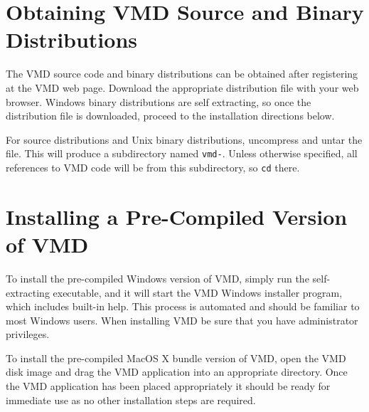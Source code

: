\documentclass[11pt]{article}
\begin{document}
\newpage


\newpage
\section{Obtaining VMD Source and Binary Distributions}
The VMD source code and binary distributions can be obtained 
after registering at the VMD web page.  
Download the appropriate distribution file with your web browser.
Windows binary distributions are self extracting, so once the
distribution file is downloaded, proceed to the installation directions
below.

For source distributions and Unix binary distributions, uncompress and 
untar the file.  This will produce a subdirectory named {\tt vmd-\VMDVER}.  
Unless otherwise specified, all references to VMD code will be from this 
subdirectory, so {\tt cd} there.

\section {Installing a Pre-Compiled Version of VMD}
To install the pre-compiled Windows version of VMD,
simply run the self-extracting executable, and it will start the
VMD Windows installer program, which includes built-in help.
This process is automated and should be familiar to most
Windows users.  When installing VMD be sure that you have administrator
privileges.

To install the pre-compiled MacOS X bundle version of VMD, open the
VMD disk image and drag the VMD application into an appropriate 
directory.  Once the VMD application has been placed appropriately
it should be ready for immediate use as no other installation
steps are required.
\end{document}
